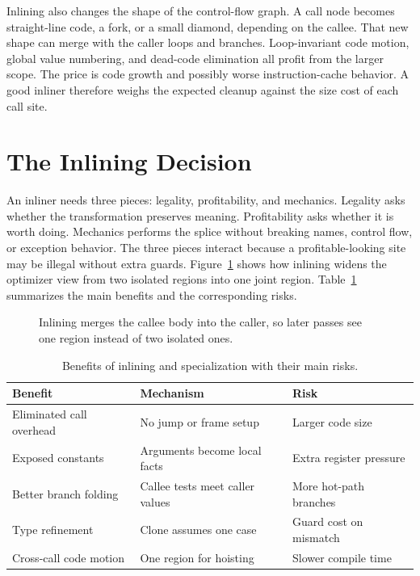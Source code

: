 Inlining also changes the shape of the control-flow graph.
A call node becomes straight-line code, a fork, or a small diamond, depending on the callee.
That new shape can merge with the caller loops and branches.
Loop-invariant code motion, global value numbering, and dead-code elimination all profit from the larger scope.
The price is code growth and possibly worse instruction-cache behavior.
A good inliner therefore weighs the expected cleanup against the size cost of each call site.

\section{The Inlining Decision}\label{sec:ch23-decision}

An inliner needs three pieces: legality, profitability, and mechanics.
Legality asks whether the transformation preserves meaning.
Profitability asks whether it is worth doing.
Mechanics performs the splice without breaking names, control flow, or exception behavior.
The three pieces interact because a profitable-looking site may be illegal without extra guards.
Figure~\ref{fig:ch23-inline-scope} shows how inlining widens the optimizer view from two isolated regions into one joint region.
Table~\ref{tab:ch23-inline-tradeoffs} summarizes the main benefits and the corresponding risks.

\begin{figure}[htbp]
\centering
{}
\caption{Inlining merges the callee body into the caller, so later passes see one region instead of two isolated ones.}
\label{fig:ch23-inline-scope}
\end{figure}

\begin{table}[htbp]
\caption{Benefits of inlining and specialization with their main risks.}
\label{tab:ch23-inline-tradeoffs}
\begin{tabular}{lll}
\toprule
Benefit & Mechanism & Risk \\
\midrule
Eliminated call overhead & No jump or frame setup & Larger code size \\
Exposed constants & Arguments become local facts & Extra register pressure \\
Better branch folding & Callee tests meet caller values & More hot-path branches \\
Type refinement & Clone assumes one case & Guard cost on mismatch \\
Cross-call code motion & One region for hoisting & Slower compile time \\
\bottomrule
\end{tabular}
\end{table}

